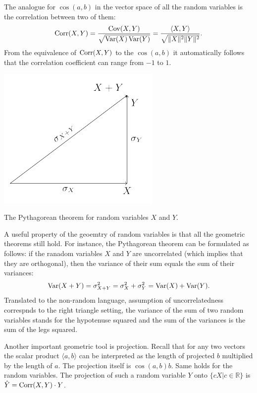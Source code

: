 The analogue for $\cos(a, b)$ in the vector space of all the random
variables is the correlation between two of them:
\[
\operatorname{Corr}(X,Y) = \frac{\operatorname{Cov}(X,Y)}{\sqrt{\operatorname{Var}(X)\operatorname{Var}(Y)}} = \frac{\langle X, Y \rangle}{\sqrt{\lVert X \rVert^2 \lVert Y \rVert^2}}.
\]
From the equivalence of $\operatorname{Corr}(X,Y)$ to the $\cos(a, b)$ it
automatically follows that the correlation coefficient can range from $-1$ to $1$.

\begin{marginfigure}[10\baselineskip]
\includegraphics{figures/01_pythagorean_theorem.pdf}
\caption{The Pythagorean theorem for random variables $X$ and $Y$.}
\label{fig:rv_pyth}
\end{marginfigure}

A useful property of the geoemtry of random variables is that all the
geometric theorems still hold. For instance, the Pythagorean theorem can
be formulated as follows: if the ranadom variables $X$ and $Y$ are uncorrelated
(which implies that they are orthogonal), then the variance of their sum equals
the sum of their variances:
\[
\operatorname{Var}(X + Y) = \sigma^2_{X+Y} = \sigma^2_{X} + \sigma^2_{Y} = \operatorname{Var}(X) + \operatorname{Var}(Y).
\]
Translated to the non-random language, assumption of uncorrelatedness correspnds
to the right triangle setting, the variance of the sum of two random variables
stands for the hypotenuse squared and the sum of the variances is the sum of
the legs squared.

Another important geometric tool is projection.
Recall that for any two vectors the scalar product $\langle a, b \rangle$
can be interpreted as the length of projected $b$ multiplied by the length of $a$.
The projection itself is $\cos(a, b) b$.
Same holds for the random variables.
The projection of such a random variable $Y$ onto $\{cX| c \in \mathbb{R}\}$ is
$\hat Y = \operatorname{Corr}(X,Y) \cdot Y$.

